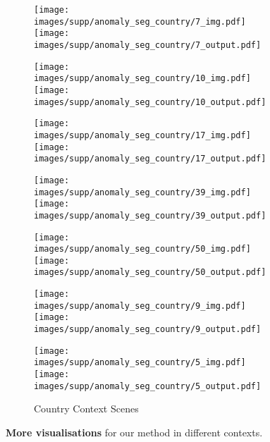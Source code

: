 \documentclass[10pt,twocolumn,letterpaper]{article}
\begin{document}
\begin{figure*}
\begin{subfigure}[b]{0.49\linewidth}
    \texttt{[image: images/supp/anomaly\_seg\_country/7\_img.pdf]} \hfill
    \texttt{[image: images/supp/anomaly\_seg\_country/7\_output.pdf]}
    
    \texttt{[image: images/supp/anomaly\_seg\_country/10\_img.pdf]} \hfill
    \texttt{[image: images/supp/anomaly\_seg\_country/10\_output.pdf]}
    
    \texttt{[image: images/supp/anomaly\_seg\_country/17\_img.pdf]} \hfill
    \texttt{[image: images/supp/anomaly\_seg\_country/17\_output.pdf]}
    
    \texttt{[image: images/supp/anomaly\_seg\_country/39\_img.pdf]} \hfill
    \texttt{[image: images/supp/anomaly\_seg\_country/39\_output.pdf]}
    
    
    \texttt{[image: images/supp/anomaly\_seg\_country/50\_img.pdf]} \hfill
    \texttt{[image: images/supp/anomaly\_seg\_country/50\_output.pdf]}
    
    
    \texttt{[image: images/supp/anomaly\_seg\_country/9\_img.pdf]} \hfill
    \texttt{[image: images/supp/anomaly\_seg\_country/9\_output.pdf]}
    
    \texttt{[image: images/supp/anomaly\_seg\_country/5\_img.pdf]} \hfill
    \texttt{[image: images/supp/anomaly\_seg\_country/5\_output.pdf]}
    
    \caption{Country Context Scenes}
    \label{fig:my_label}
\end{subfigure}
\caption{\textbf{More visualisations} for our method in different contexts.}
\label{fig:sup_anomaly_vis}
\end{figure*}
\clearpage
\end{document}
